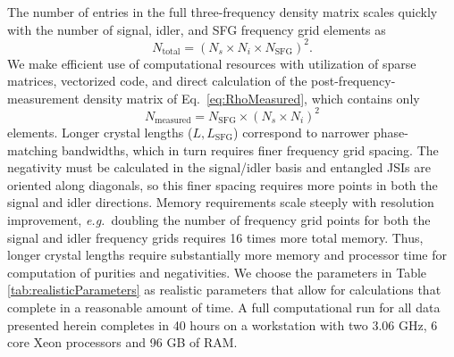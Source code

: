 \documentclass[twocolumn,amssymb, nobibnotes, showpacs, aps, pra,10pt]{revtex4-1}
\begin{document}
The number of entries in the full three-frequency density matrix scales quickly with the number of signal, idler, and SFG frequency grid elements as
\begin{equation}
N_{\text{total}}= (N_s \times N_i \times N_{\text{SFG}})^2.
\end{equation}
We make efficient use of computational resources with utilization of sparse matrices, vectorized code, and direct calculation of the post-frequency-measurement density matrix of Eq.\ \eqref{eq:RhoMeasured}, which contains only
\begin{equation} \label{eq:nMeasured}
N_{\text{measured}}= N_{\text{SFG}} \times (N_s \times N_i)^2
\end{equation}
elements. Longer crystal lengths ($L,L_{\text{SFG}}$) correspond to narrower phase-matching bandwidths, which in turn requires finer frequency grid spacing. The negativity must be calculated in the signal/idler basis and entangled JSIs are oriented along diagonals, so this finer spacing requires more points in both the signal and idler directions. Memory requirements scale steeply with resolution improvement, \emph{e.g.\ }doubling the number of frequency grid points for both the signal and idler frequency grids requires 16 times more total memory. Thus, longer crystal lengths require substantially more memory and processor time for computation of purities and negativities. We choose the parameters in Table \ref{tab:realisticParameters} as realistic parameters that allow for calculations that complete in a reasonable amount of time. A full computational run for all data presented herein completes in 40 hours on a workstation with two 3.06 GHz, 6 core Xeon processors and 96 GB of RAM.
\end{document}
